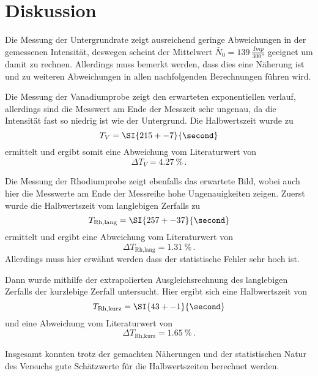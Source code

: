 \section{Diskussion}
\label{sec:Diskussion}

Die Messung der Untergrundrate zeigt ausreichend geringe Abweichungen in der gemessenen Intensität, deswegen scheint der Mittelwert $\bar{N}_0 = \SI{139}{\frac{Imp}{300\second}}$ geeignet um damit zu rechnen.
Allerdings muss bemerkt werden, dass dies eine Näherung ist und zu weiteren Abweichungen in allen nachfolgenden Berechnungen führen wird.

Die Messung der Vanadiumprobe zeigt den erwarteten exponentiellen verlauf, allerdings sind die Messwert am Ende der Messzeit sehr ungenau, da die Intensität fast so niedrig ist wie der Untergrund.
Die Halbwertszeit wurde zu
\begin{equation*}
    T_V = \SI{215+-7}{\second}
\end{equation*}
ermittelt und ergibt somit eine Abweichung vom Literaturwert von
\begin{equation*}
    \Delta T_V = \SI{4.27}{\percent} \, .
\end{equation*}

Die Messung der Rhodiumprobe zeigt ebenfalls das erwartete Bild, wobei auch hier die Messwerte am Ende der Messreihe hohe Ungenauigkeiten zeigen.
Zuerst wurde die Halbwertszeit vom langlebigen Zerfalls zu
\begin{equation*}
    T_\text{Rh,lang} = \SI{257+-37}{\second}
\end{equation*}
ermittelt und ergibt eine Abweichung vom Literaturwert von 
\begin{equation*}
    \Delta T_\text{Rh,lang} = \SI{1.31}{\percent} \, .
\end{equation*}
Allerdings muss hier erwähnt werden dass der statistische Fehler sehr hoch ist.

Dann wurde mithilfe der extrapolierten Ausgleichsrechnung des langlebigen Zerfalls der kurzlebige Zerfall untersucht.
Hier ergibt sich eine Halbwertszeit von
\begin{equation*}
    T_\text{Rh,kurz} = \SI{43+-1}{\second}
\end{equation*}
und eine Abweichung vom Literaturwert von 
\begin{equation*}
    \Delta T_\text{Rh,kurz} = \SI{1.65}{\percent} \, .
\end{equation*}

Insgesamt konnten trotz der gemachten Näherungen und der statistischen Natur des Versuchs gute Schätzwerte für die Halbwertszeiten berechnet werden.